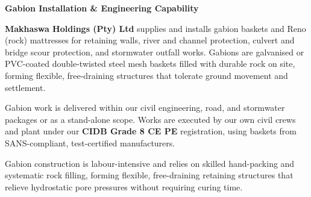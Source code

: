 \documentclass[a4paper,11pt]{article}
\begin{document}
\noindent
\begin{minipage}[t]{0.62\textwidth}
    \vspace{0pt}
    {\large\bfseries\color{mhnavy} Gabion Installation \& Engineering Capability}
    \vspace{0.12cm}

    {\fontsize{9.0pt}{13.0pt}\selectfont\color{mhtext}
    \textbf{Makhaswa Holdings (Pty) Ltd} supplies and installs gabion baskets and Reno (rock) mattresses for retaining walls, river and channel protection, culvert and bridge scour protection, and stormwater outfall works. Gabions are galvanised or PVC-coated double-twisted steel mesh baskets filled with durable rock on site, forming flexible, free-draining structures that tolerate ground movement and settlement.
    }

    \vspace{0.22cm}

    {\fontsize{9.0pt}{13.0pt}\selectfont\color{mhtext}
    Gabion work is delivered within our civil engineering, road, and stormwater packages or as a stand-alone scope. Works are executed by our own civil crews and plant under our \textbf{CIDB Grade 8 CE PE} registration, using baskets from SANS-compliant, test-certified manufacturers.
    }

    \vspace{0.22cm}

    {\fontsize{9.0pt}{13.0pt}\selectfont\color{mhtext}
    Gabion construction is labour-intensive and relies on skilled hand-packing and systematic rock filling, forming flexible, free-draining retaining structures that relieve hydrostatic pore pressures without requiring curing time.
    }
\end{minipage}
\hfill
\end{document}
